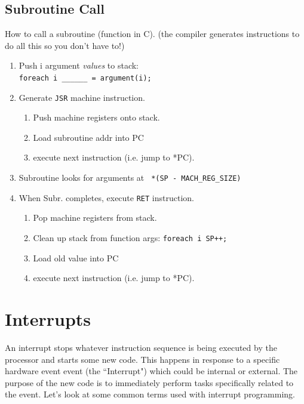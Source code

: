 \documentclass{article}	%
\begin{document}
\subsection{Subroutine Call}
How to call a subroutine (function in C).
(the compiler generates instructions to do all this
so you don't have to!)
\begin{enumerate}
        \item Push i argument {\it values} to stack: \\
                {\tt foreach {i} \_\_\_\_\_\_ = argument(i);}
        \item Generate {\tt JSR} machine instruction.
        \begin{enumerate}
                \item Push machine registers onto stack.
                \item Load subroutine addr into PC
                \item execute next instruction (i.e. jump to
                *PC).
        \end{enumerate}
        \item Subroutine looks for arguments at {\tt
                *(SP - MACH\_REG\_SIZE) }
        \item When Subr. completes, execute {\tt RET} instruction.
        \begin{enumerate}
                \item Pop machine registers from stack.
                \item Clean up stack from function args:
                {\tt foreach {i} SP++;}
                \item Load old value into PC
                \item execute next instruction (i.e. jump to
                *PC).
        \end{enumerate}



\end{enumerate}

\section{Interrupts}

An interrupt stops whatever instruction sequence is being executed by the processor and starts
some new code.  This happens in response to a specific hardware event event (the ``Interrupt") which 
could be internal or external.  The purpose of the new code is to immediately perform tasks 
specifically related to the event.   Let's look at some common terms used with interrupt programming.
\end{document}
